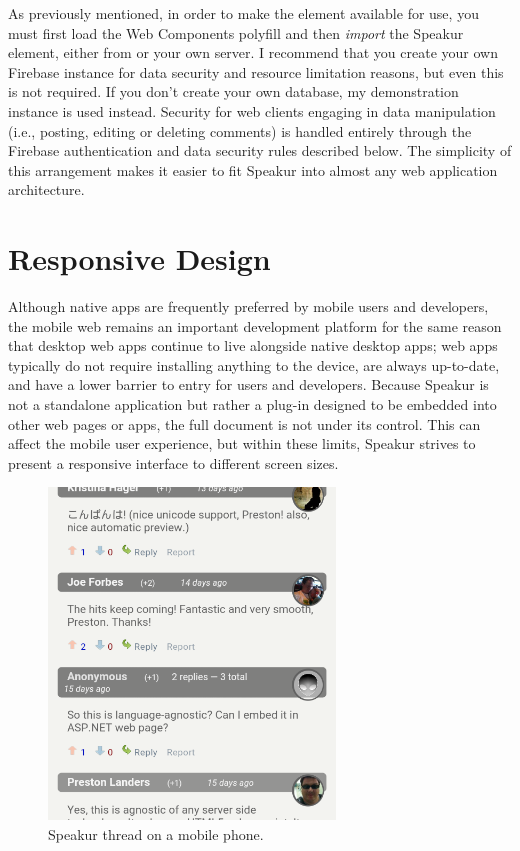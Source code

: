 As previously mentioned, in order to make the 
 element available for use, 
you must first load the Web Components polyfill and then \textit{import} the Speakur element, 
either from  or your own server.
I recommend that you create your own Firebase instance for data security and resource limitation reasons, but even this is not required. 
If you don't create your own database, my demonstration instance is used instead.
Security for web clients engaging in data manipulation 
(i.e., posting, editing or deleting comments) 
is handled entirely through the Firebase authentication 
and data security rules described below.
The simplicity of this arrangement makes it easier to fit Speakur into almost any web application architecture.

\section{Responsive Design}
\label{bg:mobile}
Although native apps are frequently preferred by mobile users and developers, 
the mobile web remains an important development platform for the same reason that 
desktop web apps continue to live alongside native desktop apps; 
web apps typically do not require installing anything to the device, are always up-to-date, and have a lower barrier to entry for users and developers.
Because Speakur is not a standalone application but rather a plug-in designed to be embedded into other web pages or apps, 
the full document is not under its control.
This can affect the mobile user experience,
but within these limits, Speakur strives to present a responsive interface to different screen sizes.

\begin{figure}[htb]
\centering
 \includegraphics[width=3in]{images/mobile2.png}
\caption{Speakur thread on a mobile phone.}
\label{f:mobile1}
\end{figure}


